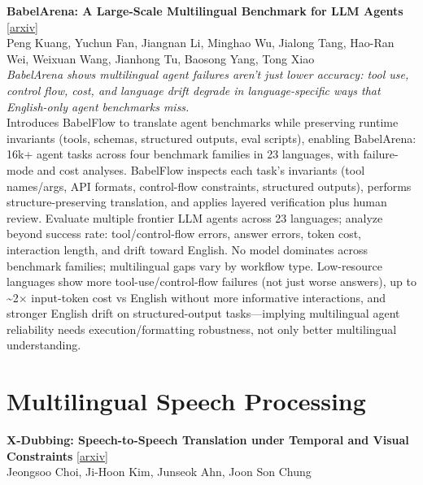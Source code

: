 \documentclass[12pt,letterpaper]{article}
\begin{document}
\medskip

{\small\textbf{BabelArena: A Large-Scale Multilingual Benchmark for LLM Agents}} {\scriptsize[\href{https://arxiv.org/abs/2609.23490}{arxiv}]}\\
{\scriptsize Peng Kuang, Yuchun Fan, Jiangnan Li, Minghao Wu, Jialong Tang, Hao-Ran Wei, Weixuan Wang, Jianhong Tu, Baosong Yang, Tong Xiao}\\

{\small\textit{BabelArena shows multilingual agent failures aren't just lower accuracy: tool use, control flow, cost, and language drift degrade in language-specific ways that English-only agent benchmarks miss.}}\\[1pt]
{\footnotesize Introduces BabelFlow to translate agent benchmarks while preserving runtime invariants (tools, schemas, structured outputs, eval scripts), enabling BabelArena: 16k+ agent tasks across four benchmark families in 23 languages, with failure-mode and cost analyses. BabelFlow inspects each task's invariants (tool names/args, API formats, control-flow constraints, structured outputs), performs structure-preserving translation, and applies layered verification plus human review. Evaluate multiple frontier LLM agents across 23 languages; analyze beyond success rate: tool/control-flow errors, answer errors, token cost, interaction length, and drift toward English. No model dominates across benchmark families; multilingual gaps vary by workflow type. Low-resource languages show more tool-use/control-flow failures (not just worse answers), up to \textasciitilde{}2× input-token cost vs English without more informative interactions, and stronger English drift on structured-output tasks---implying multilingual agent reliability needs execution/formatting robustness, not only better multilingual understanding.}

\medskip


\section*{Multilingual Speech Processing}

{\small\textbf{X-Dubbing: Speech-to-Speech Translation under Temporal and Visual Constraints}} {\scriptsize[\href{https://arxiv.org/abs/2610.32042}{arxiv}]}\\
{\scriptsize Jeongsoo Choi, Ji-Hoon Kim, Junseok Ahn, Joon Son Chung}\\
\end{document}
